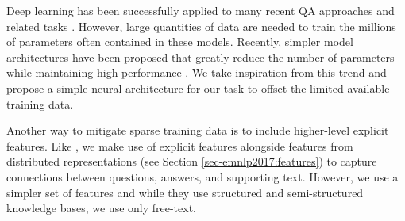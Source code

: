 Deep learning has been successfully applied to many recent QA approaches and related tasks \citep[][inter alia]{Bordes2015LargescaleSQ,nips15_hermann, He2016CharacterLevelQA, dong2015question, Tan2016ImprovedRL}.
However, large quantities of data are needed to train the millions of parameters often contained in these models.  
Recently, simpler model architectures have been proposed that greatly reduce the number of parameters while maintaining high performance \cite[e.g.,][]{Iyyer2015,chen2016thorough,Parikh2016ADA}.  
We take inspiration from this trend and propose a simple neural architecture for our task to offset the limited available training data. 


Another way to mitigate sparse training data is to include higher-level explicit features.  Like \citet{sachan2016science}, we make use of explicit features alongside features from distributed representations (see Section \ref{sec-emnlp2017:features}) to capture connections between questions, answers, and supporting text.  However, we use a simpler set of features and while they use structured and semi-structured knowledge bases, we use only free-text.  %





